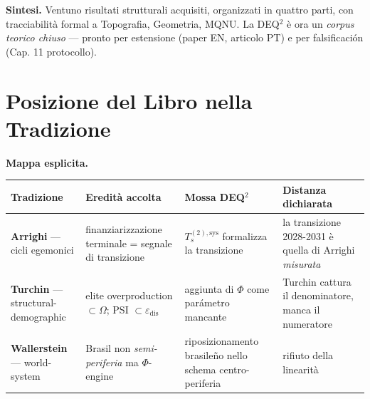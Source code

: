 \Hypoth{} \textbf{Sintesi.} Ventuno risultati strutturali acquisiti,
organizzati in quattro parti, con tracciabilità formal a Topografia,
Geometria, MQNU. La DEQ$^2$ è ora un \emph{corpus teorico chiuso} ---
pronto per estensione (paper EN, articolo PT) e per falsificación (Cap.
11 protocollo).



\section{Posizione del Libro nella
Tradizione}\label{posizione-del-libro-nella-tradizione}

\Hypoth{} \textbf{Mappa esplicita.}

{\def\LTcaptype{none} %
{\small\begin{longtable}[]{@{}
  >{\raggedright\arraybackslash}p{}
  >{\raggedright\arraybackslash}p{}
  >{\raggedright\arraybackslash}p{}
  >{\raggedright\arraybackslash}p{}@{}}
\toprule\noalign{}
\begin{minipage}[b]{\linewidth}\raggedright
Tradizione
\end{minipage} & \begin{minipage}[b]{\linewidth}\raggedright
Eredità accolta
\end{minipage} & \begin{minipage}[b]{\linewidth}\raggedright
Mossa DEQ$^2$
\end{minipage} & \begin{minipage}[b]{\linewidth}\raggedright
Distanza dichiarata
\end{minipage} \\
\midrule\noalign{}
\endhead
\bottomrule\noalign{}
\endlastfoot
\textbf{Arrighi} --- cicli egemonici & finanziarizzazione terminale =
segnale di transizione & \(T_s^{(2),\text{sys}}\) formalizza la
transizione & la transizione 2028-2031 è quella di Arrighi
\emph{misurata} \\
\textbf{Turchin} --- structural-demographic & elite overproduction
\(\subset \Omega\); PSI \(\subset \varepsilon_{\text{dis}}\) & aggiunta
di \(\Phi\) come parámetro mancante & Turchin cattura il denominatore,
manca il numeratore \\
\textbf{Wallerstein} --- world-system & Brasil non
\emph{semi-periferia} ma \(\Phi\)-engine & riposizionamento brasileño
nello schema centro-periferia & rifiuto della linearità

\end{longtable}}}
